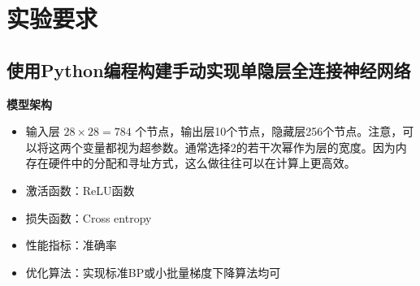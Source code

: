 \documentclass[12pt]{article}
\begin{document}
\section{实验要求}
\subsection{\textbf{使用Python编程构建手动实现单隐层全连接神经网络}}

\textbf{模型架构}
\begin{itemize}
    \item 输入层 \( 28 \times 28 = 784 \) 个节点，输出层10个节点，隐藏层256个节点。注意，可以将这两个变量都视为超参数。通常选择2的若干次幂作为层的宽度。因为内存在硬件中的分配和寻址方式，这么做往往可以在计算上更高效。
    \item 激活函数：ReLU函数
    \item 损失函数：Cross entropy
    \item 性能指标：准确率
    \item 优化算法：实现标准BP或小批量梯度下降算法均可
\end{itemize}
\end{document}
